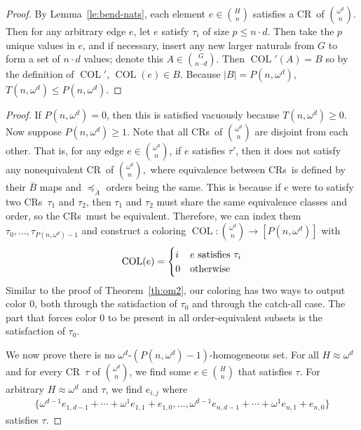 \documentclass[10pt,a4paper]{article}
\newcommand{\om}{\omega}
\newcommand{\oequiv}{\approx}
\newcommand{\COL}{\operatorname{COL}}
\newcommand{\crulenospace}{CR}
\newcommand{\crule}{\crulenospace~}
\newcommand{\crules}{\crulenospace s~}
\newcommand{\xleq}{\preceq_{\overline{A}}}
\newcommand{\assny}{\overline{B}}
\newcommand{\numpoints}{n}
\newcommand{\inumpoints}{i}
\newcommand{\idegr}{j}
\newcommand{\Commonconst}{A}
\newcommand{\Rareconst}{B}
\theoremstyle{plain}
\theoremstyle{definition}
\begin{document}
\begin{proof}
By Lemma~\ref{le:bend-nats}, each element $e \in \binom{H}{\numpoints}$ satisfies a \crule of $\binom{\om^d}{\numpoints}$. 
Then for any arbitrary edge $e$, let $e$ satisfy $\tau_i$ of size $p \leq \numpoints \cdot d$. 
Then take the $p$ unique values in $e$, and if necessary, insert any new larger naturals from 
$G$ to form a set of $\numpoints \cdot d$ values; denote this $\Commonconst \in \binom{G}{\numpoints \cdot d}$.
Then
$\COL'(\Commonconst) = \Rareconst$ so by the definition of $\COL'$, $\COL(e) \in \Rareconst$. 
Because $|\Rareconst| = P(\numpoints,\om^d)$, $T(\numpoints,\om^d) \leq P(\numpoints,\om^d)$.
\end{proof}

\begin{proof}
If $P(\numpoints,\om^d) = 0$, then this is satisfied vacuously because $T(\numpoints, \om^d) \geq 0$. Now suppose $P(\numpoints,\om^d) \geq 1$. Note that all \crules of $\binom{\om^d}{\numpoints}$ are disjoint from each other. That is, for any edge $e \in \binom{\om^d}{\numpoints}$, if $e$ satisfies $\tau'$, then it does not satisfy any nonequivalent \crule of $\binom{\om^d}{\numpoints},$ where
equivalence between \crules is defined by their $\assny$ maps and $\xleq$ orders being
the same. This is because if $e$ were to satisfy two \crules $\tau_1$ and $\tau_2$, then $\tau_1$ and $\tau_2$ must share the same equivalence classes and order, so the \crules must be equivalent. Therefore, we can index them $\tau_0, \ldots, \tau_{P(\numpoints, \om^d)-1}$ and construct a coloring $\COL \colon \binom{\om^d}{\numpoints} \to [P(\numpoints, \om^d)]$ with\begin{align*}
    \COL(e) = \begin{cases}
    i & e \textnormal{ satisfies } \tau_i\\
    0 & \textnormal{otherwise}
    \end{cases}
\end{align*}
Similar to the proof of Theorem~\ref{th:om2}, our coloring has two ways to output color 0, both 
through the satisfaction of $\tau_0$ and through the catch-all case. The part that forces 
color 0 to be present in all order-equivalent subsets is the satisfaction of $\tau_0$.

We now prove there is no $\omega^d$-$(P(\numpoints,\om^d)-1)$-homogeneous set. 
For all $H \oequiv \om^{d}$ and 
for every \crule $\tau$ of $\binom{\om^d}{\numpoints}$, 
we find some $e \in \binom{H}{\numpoints}$ that satisfies $\tau$.
For arbitrary $H \oequiv \om^{d}$ and $\tau$, we find $e_{\inumpoints,\idegr}$ where 
\begin{align*}
    \{\om^{d-1} e_{1,d-1} + \cdots + \om^{1} e_{1,1} + e_{1,0}, \ldots,
    \om^{d-1} e_{\numpoints,d-1} + \cdots + \om^{1} e_{\numpoints,1} + e_{\numpoints,0}\}
\end{align*}
satisfies $\tau$.


\end{proof}
\end{document}
